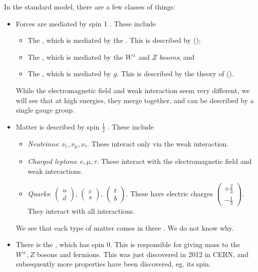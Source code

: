 \documentclass[a4paper]{article}
\begin{document}
In the standard model, there are a few classes of things:
\begin{itemize}
  \item Forces are mediated by spin 1 . These include
    \begin{itemize}
      \item The , which is mediated by the . This is described by  ();
      \item The , which is mediated by the $W^{\pm}$ and $Z$ \emph{bosons}; and
      \item The , which is mediated by  $g$. This is described by the theory of  ().
    \end{itemize}
    While the electromagnetic field and weak interaction seem very different, we will see that at high energies, they merge together, and can be described by a single gauge group.
  \item Matter is described by spin $\frac{1}{2}$ . These include
    \begin{itemize}
      \item \emph{Neutrinos}: $\nu_e, \nu_\mu, \nu_\tau$. These interact only via the weak interaction.
      \item \emph{Charged leptons}: $e, \mu, \tau$. These interact with the electromagnetic field and weak interactions.
      \item \emph{Quarks}: $\begin{pmatrix}u\\d\end{pmatrix}$, $\begin{pmatrix}c\\s\end{pmatrix}$, $\begin{pmatrix}t\\b\end{pmatrix}$. These have electric charges $\begin{pmatrix}+\frac{2}{3}\\ -\frac{1}{3}\end{pmatrix}$. They interact with all interactions.
    \end{itemize}
    We see that each type of matter comes in three . We do not know why.
  \item There is the , which has spin 0. This is responsible for giving mass to the $W^{\pm}, Z$ bosons and fermions. This was just discovered in 2012 in CERN, and subsequently more properties have been discovered, eg. its spin.
\end{itemize}
\end{document}
